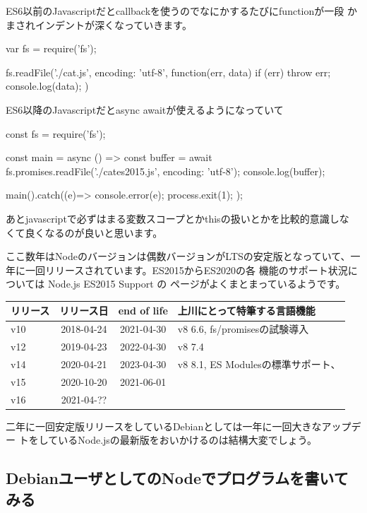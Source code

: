 \documentclass[mingoth,a4paper]{jsarticle}
\begin{document}
ES6以前のJavascriptだとcallbackを使うのでなにかするたびにfunctionが一段
かまされインデントが深くなっていきます。

\begin{commandline}
var fs = require('fs');

fs.readFile('./cat.js', {encoding: 'utf-8'}, function(err, data) {
    if (err) throw err;
    console.log(data);
})
\end{commandline}

ES6以降のJavascriptだとasync awaitが使えるようになっていて

\begin{commandline}
const fs  = require('fs');

const main = async () => {
    const buffer = await fs.promises.readFile('./cates2015.js',
					      {encoding: 'utf-8'});
    console.log(buffer);
}

main().catch((e)=>{
    console.error(e);
    process.exit(1);
});

\end{commandline}

あとjavascriptで必ずはまる変数スコープとかthisの扱いとかを比較的意識しな
くて良くなるのが良いと思います。

ここ数年はNodeのバージョンは偶数バージョンがLTSの安定版となっていて、一
年に一回リリースされています\cite{nodejsreleases}。ES2015からES2020の各
機能のサポート状況については Node.js ES2015 Support \cite{node-green}の
ページがよくまとまっているようです。

\begin{tabular}{|l|c|c|l|}
\hline
リリース & リリース日 & end of life & 上川にとって特筆する言語機能\\
\hline
v10 & 2018-04-24 & 2021-04-30 & v8 6.6, fs/promisesの試験導入 \\
v12 & 2019-04-23 & 2022-04-30 & v8 7.4\\
v14 & 2020-04-21 & 2023-04-30 & v8 8.1, ES Modulesの標準サポート、 \\
v15 & 2020-10-20 & 2021-06-01 &  \\
v16 & 2021-04-?? &            &  \\
\hline
\end{tabular}

二年に一回安定版リリースをしているDebianとしては一年に一回大きなアップデー
トをしているNode.jsの最新版をおいかけるのは結構大変でしょう。

\subsection{DebianユーザとしてのNodeでプログラムを書いてみる}
\end{document}
